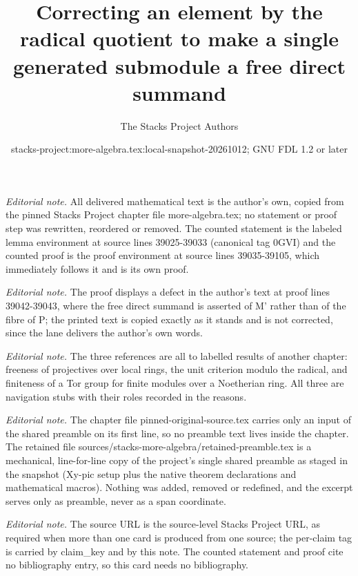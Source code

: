 \documentclass[10pt,a4paper]{amsart}
\title{Correcting an element by the radical quotient to make a single generated submodule a free direct summand}
\author{The Stacks Project Authors}
\date{stacks-project:more-algebra.tex:local-snapshot-20261012; GNU FDL 1.2 or later}
\theoremstyle{plain}
\theoremstyle{definition}
\theoremstyle{remark}
\numberwithin{equation}{subsection}
\begin{document}
\maketitle
\setcounter{subsection}{1}
\noindent\textit{Editorial note.} All delivered mathematical text is the author's own, copied from the pinned Stacks Project chapter file more-algebra.tex; no statement or proof step was rewritten, reordered or removed. The counted statement is the labeled lemma environment at source lines 39025-39033 (canonical tag 0GVI) and the counted proof is the proof environment at source lines 39035-39105, which immediately follows it and is its own proof.\par\medskip
\noindent\textit{Editorial note.} The proof displays a defect in the author's text at proof lines 39042-39043, where the free direct summand is asserted of M' rather than of the fibre of P; the printed text is copied exactly as it stands and is not corrected, since the lane delivers the author's own words.\par\medskip
\noindent\textit{Editorial note.} The three references are all to labelled results of another chapter: freeness of projectives over local rings, the unit criterion modulo the radical, and finiteness of a Tor group for finite modules over a Noetherian ring. All three are navigation stubs with their roles recorded in the reasons.\par\medskip
\noindent\textit{Editorial note.} The chapter file pinned-original-source.tex carries only an input of the shared preamble on its first line, so no preamble text lives inside the chapter. The retained file sources/stacks-more-algebra/retained-preamble.tex is a mechanical, line-for-line copy of the project's single shared preamble as staged in the snapshot (Xy-pic setup plus the native theorem declarations and mathematical macros). Nothing was added, removed or redefined, and the excerpt serves only as preamble, never as a span coordinate.\par\medskip
\noindent\textit{Editorial note.} The source URL is the source-level Stacks Project URL, as required when more than one card is produced from one source; the per-claim tag is carried by claim\_key and by this note. The counted statement and proof cite no bibliography entry, so this card needs no bibliography.\par\medskip
\end{document}
